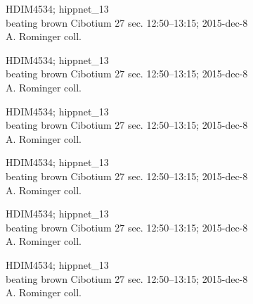 \documentclass[2pt]{extarticle}
\begin{document}
\noindent
\parbox{0.16\textwidth}{\tiny \raggedright \rule[-0.3\baselineskip]{0pt}{10pt}HDIM4534; hippnet\_13\\ beating brown Cibotium 27 sec. 12:50--13:15; 2015-dec-8\\ A. Rominger coll.}
\parbox{0.16\textwidth}{\tiny \raggedright \rule[-0.3\baselineskip]{0pt}{10pt}HDIM4534; hippnet\_13\\ beating brown Cibotium 27 sec. 12:50--13:15; 2015-dec-8\\ A. Rominger coll.}
\parbox{0.16\textwidth}{\tiny \raggedright \rule[-0.3\baselineskip]{0pt}{10pt}HDIM4534; hippnet\_13\\ beating brown Cibotium 27 sec. 12:50--13:15; 2015-dec-8\\ A. Rominger coll.}
\parbox{0.16\textwidth}{\tiny \raggedright \rule[-0.3\baselineskip]{0pt}{10pt}HDIM4534; hippnet\_13\\ beating brown Cibotium 27 sec. 12:50--13:15; 2015-dec-8\\ A. Rominger coll.}
\parbox{0.16\textwidth}{\tiny \raggedright \rule[-0.3\baselineskip]{0pt}{10pt}HDIM4534; hippnet\_13\\ beating brown Cibotium 27 sec. 12:50--13:15; 2015-dec-8\\ A. Rominger coll.}
\parbox{0.16\textwidth}{\tiny \raggedright \rule[-0.3\baselineskip]{0pt}{10pt}HDIM4534; hippnet\_13\\ beating brown Cibotium 27 sec. 12:50--13:15; 2015-dec-8\\ A. Rominger coll.} \\ 
\vspace{0.001in} 
\end{document}
